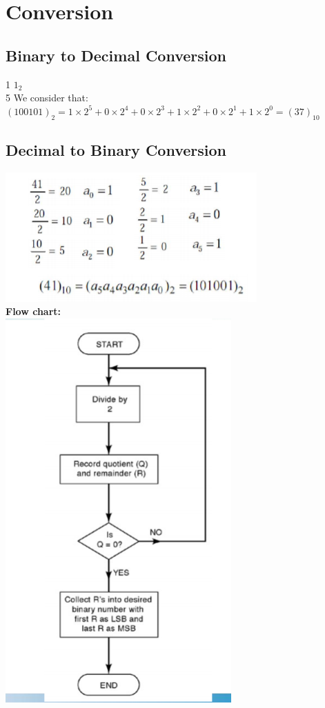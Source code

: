 \documentclass[12pt]{article}
\begin{document}
\section{Conversion}
\subsection*{Binary to Decimal Conversion}
1     \: $1_2$ \\
5      
We consider that:\\
$(100101)_2 = 1 \times 2^5 + 0 \times 2^4 + 0 \times 2^3 + 1 \times 2^2 + 0 \times 2^1 + 1 \times 2^0 = (37)_{10}$
\subsection*{Decimal to Binary Conversion}
\includegraphics{hinh2}\\
\textbf{Flow chart:}\\
\includegraphics{hinh}
\end{document}
